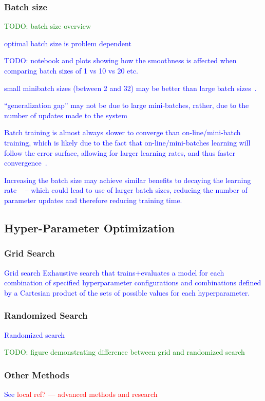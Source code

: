 \subsubsection{Batch size}

\textcolor{green}{TODO: batch size overview}

\textcolor{blue}{optimal batch size is problem dependent}

\textcolor{blue}{TODO: notebook and plots showing how the smoothness is affected when comparing batch sizes of 1 vs 10 vs 20 etc.}

\textcolor{blue}{small minibatch sizes (between 2 and 32) may be better than large batch sizes~\cite{masters2018revisiting}.}

\textcolor{blue}{``generalization gap'' may not be due to large mini-batches, rather, due to the number of updates made to the system~\cite{hoffer2017train}}

\textcolor{blue}{Batch training is almost always slower to converge than on-line/mini-batch training, which is likely due to the fact that on-line/mini-batches learning will follow the error surface, allowing for larger learning rates, and thus faster convergence~\cite{wilson2003general}.}

\textcolor{blue}{Increasing the batch size may achieve similar benefits to decaying the learning rate ~\cite{smith2017don} -- which could lead to use of larger batch sizes, reducing the number of parameter updates and therefore reducing training time.}

\subsection{Hyper-Parameter Optimization}

\subsubsection{Grid Search}

\textcolor{blue}{{Grid search} Exhaustive search that trains+evaluates a model for each combination of specified hyperparameter configurations and combinations defined by a Cartesian product of the sets of possible values for each hyperparameter.}

\subsubsection{Randomized Search}

\textcolor{blue}{{Randomized search} }

\textcolor{green}{TODO: figure demonstrating difference between grid and randomized search}

\subsubsection{Other Methods}

\textcolor{blue}{See \textcolor{red}{local ref? --- advanced methods and research}}